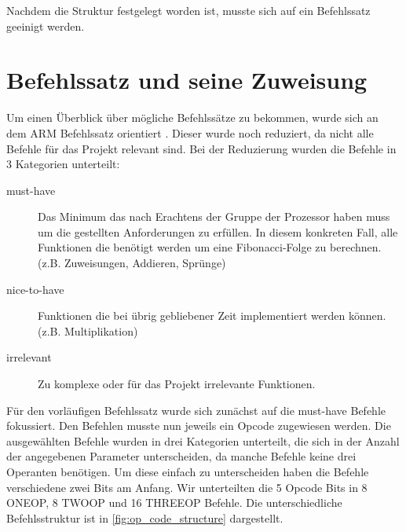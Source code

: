 \documentclass[paper=a4,fontsize=12pt,twocolumn]{scrreprt}
\begin{document}
Nachdem die Struktur festgelegt worden ist, musste sich auf ein Befehlssatz geeinigt werden.

\section{Befehlssatz und seine Zuweisung}
\label{ch:befehlssatz_und_seine_zuweisung}
Um einen Überblick über mögliche Befehlssätze zu bekommen, wurde sich an dem ARM Befehlssatz orientiert \autocite{ARMBefehlssatz}.
Dieser wurde noch reduziert, da nicht alle Befehle für das Projekt relevant sind.
Bei der Reduzierung wurden die Befehle in 3 Kategorien unterteilt:

\begin{description}
    \item[must-have]
    Das Minimum das nach Erachtens der Gruppe der Prozessor haben muss um die gestellten Anforderungen zu erfüllen. In diesem konkreten Fall, alle Funktionen die benötigt werden um eine Fibonacci-Folge zu berechnen. (z.B. Zuweisungen, Addieren, Sprünge) 
    \item[nice-to-have]
    Funktionen die bei übrig gebliebener Zeit implementiert werden können.(z.B. Multiplikation)
    \item[irrelevant]
    Zu komplexe oder für das Projekt irrelevante Funktionen.
\end{description}

Für den vorläufigen Befehlssatz wurde sich zunächst auf die must-have Befehle fokussiert.
Den Befehlen musste nun jeweils ein Opcode zugewiesen werden.
Die ausgewählten Befehle wurden in drei Kategorien unterteilt, die sich in der Anzahl der angegebenen Parameter unterscheiden, da manche Befehle keine drei Operanten benötigen.
Um diese einfach zu unterscheiden haben die Befehle verschiedene zwei Bits am Anfang.
Wir unterteilten die 5 Opcode Bits in 8 ONEOP, 8 TWOOP und 16 THREEOP Befehle.
Die unterschiedliche Befehlsstruktur ist in \ref{fig:op_code_structure} dargestellt.
\end{document}
